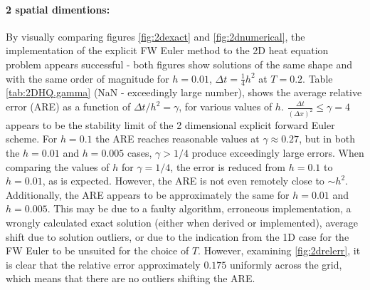 \documentclass[%
oneside,                 %
final,                   %
10pt]{article}
\begin{document}
\paragraph{2 spatial dimentions:}
By visually comparing figures \ref{fig:2dexact} and \ref{fig:2dnumerical}, the implementation of the explicit FW Euler method to the 2D heat equation problem appears successful - both figures show solutions of the same shape and with the same order of magnitude for $h=0.01$, $\Delta t=\frac{1}{4} h^2$ at $T=0.2$. Table \ref{tab:2DHQ.gamma} (NaN - exceedingly large number), shows the average relative error (ARE) as a function of $\Delta t/h^2 = \gamma $, for various values of $h$. $\frac{\Delta t}{(\Delta x)^2}\leq \gamma=4$ appears to be the stability limit of the 2 dimensional explicit forward Euler scheme. For $h=0.1$ the ARE reaches reasonable values at $\gamma\approx 0.27$, but in both the $h=0.01$ and $h=0.005$ cases, $\gamma>1/4$ produce exceedingly large errors. When comparing the values of $h$ for $\gamma=1/4$, the error is reduced from $h=0.1$ to $h=0.01$, as is expected. However, the ARE is not even remotely close to $\sim h^2$. Additionally, the ARE appears to be approximately the same for $h=0.01$ and $h=0.005$. This may be due to a faulty algorithm, erroneous implementation, a wrongly calculated exact solution (either when derived  or implemented), average shift due to solution outliers, or due to the indication from the 1D case for the FW Euler to be unsuited for the choice of $T$. However, examining \ref{fig:2drelerr}, it is clear that the relative error approximately $0.175$ uniformly across the grid, which means that there are no outliers shifting the ARE.
\end{document}
